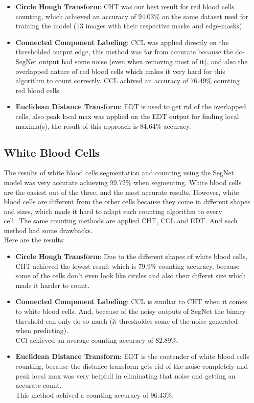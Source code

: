 \begin{itemize}
  \item \textbf{Circle Hough Transform}: CHT was our best result for red blood cells counting, which achieved an accuracy of 94.03\% on the same dataset used for training the model (13 images with their respective masks and edge-masks).
  \item \textbf{Connected Component Labeling}: CCL was applied directly on the thresholded output edge, this method was far from accurate because the do-SegNet output had some noise (even when removing most of it), and also the overlapped nature of red blood cells which makes it very hard for this algorithm to count correctly. CCL achived an accuracy of 76.49\% counting red blood cells.
  \item \textbf{Euclidean Distance Transform}: EDT is used to get rid of the overlapped cells, also peak local max was applied on the EDT output for finding local maxima(s), the result of this approach is 84.64\% accuracy.
\end{itemize}



\subsection{White Blood Cells}
\hspace{\parindent}
The results of white blood cells segmentation and counting using the SegNet model was very accurate achieving 99.72\% when segmenting.
White blood cells are the easiest out of the three, and the most accurate results.
However, white blood cells are different from the other cells because they come in different shapes and sizes, which made it hard to adapt each counting algorithm to every cell.\
The same counting methods are applied CHT, CCL and EDT. And each method had some drawbacks.\\
Here are the results:

\begin{itemize}
  \item \textbf{Circle Hough Transform}: Due to the different shapes of white blood cells, CHT achieved the lowest result which is 79.9\% counting accuracy, because some of the cells don't even look like circles and also their differet size which made it harder to count.
  \item \textbf{Connected Component Labeling}: CCL is similiar to CHT when it comes to white blood cells. And, because of the noisy outputs of SegNet the binary threshold can only do so much (it thresholdes some of the noise generated when predicting).\\
    CCl achieved an average counting accuracy of 82.89\%.
  \item \textbf{Euclidean Distance Transform}: EDT is the contender of white blood cells counting, because the distance transform gets rid of the noise completely and peak local max was very helpfull in eliminating that noise and getting an accurate count.\\
    This method achived a counting accuracy of 96.43\%.
\end{itemize}

